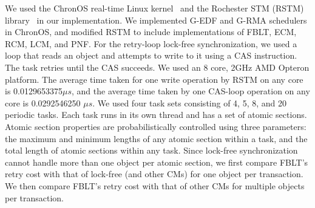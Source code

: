 \documentclass[conference,letterpaper]{IEEEtran}
\begin{document}
We used the ChronOS real-time Linux kernel~\cite{dellinger2011chronos}
and the Rochester STM (RSTM) library~\cite{marathe2006lowering} in our implementation. We implemented G-EDF and G-RMA schedulers in ChronOS, and modified RSTM to include implementations of FBLT, ECM, RCM, LCM, and PNF. For the retry-loop lock-free synchronization, we used a loop that reads an object and attempts to write to it using a CAS  instruction. The task retries until the CAS succeeds. We used an 8 core, 2GHz AMD Opteron platform. The average time taken for one write operation by RSTM on any core is 0.0129653375$\mu s$, and the average time taken by one CAS-loop operation on any core is 0.0292546250 $\mu s$. We used four task sets consisting of 4, 5, 8, and 20 periodic tasks. Each task runs in its own thread and has a set of atomic sections. Atomic section properties are probabilistically controlled using three parameters: the maximum and minimum lengths of any atomic section within a task, and the total length of atomic sections within any task. Since lock-free synchronization cannot handle more than one object per atomic section, we first compare FBLT's retry cost with that of lock-free (and other CMs) for one object per transaction. We then compare FBLT's retry cost with that of other CMs for multiple objects per transaction.
%
\end{document}
